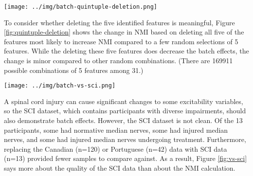 \documentclass[12pt]{article}
\begin{document}
\pagebreak

\begin{figure*}
  \centering
       \texttt{[image: ../img/batch-quintuple-deletion.png]}
         \caption{}
  \label{fig:quintuple-deletion}
\end{figure*}

To consider whether deleting the five identified features is meaningful, Figure \ref{fig:quintuple-deletion} shows the change in NMI based on deleting all five of the features most likely to increase NMI compared to a few random selections of 5 features. While the deleting these five features does decrease the batch effects, the change is minor compared to other random combinations. (There are 169911 possible combinations of 5 features among 31.)

\pagebreak

\begin{figure*}
  \centering
       \texttt{[image: ../img/batch-vs-sci.png]}
         \caption{}
  \label{fig:vs-sci}
\end{figure*}

A spinal cord injury can cause significant changes to some excitability variables, so the SCI dataset, which contains participants with diverse impairments, should also demonstrate batch effects. However, the SCI dataset is not clean. Of the 13 participants, some had normative median nerves, some had injured median nerves, and some had injured median nerves undergoing treatment. Furthermore, replacing the Canadian (n=120) or Portuguese (n=42) data with SCI data (n=13) provided fewer samples to compare against. As a result, Figure \ref{fig:vs-sci} says more about the quality of the SCI data than about the NMI calculation.

\pagebreak
\end{document}
